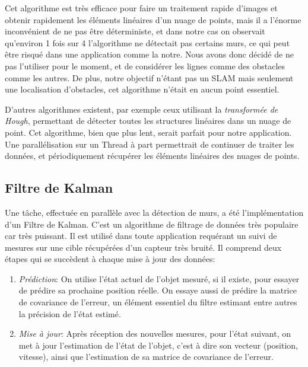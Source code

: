 
Cet algorithme est très efficace pour faire un traitement rapide d'images et obtenir rapidement les éléments linéaires d'un nuage de points, mais il a l'énorme inconvénient de ne pas être déterministe, et dans notre cas on observait qu'environ 1 fois sur 4 l'algorithme ne détectait pas certains murs, ce qui peut être risqué dans une application comme la notre. Nous avons donc décidé de ne pas l'utiliser pour le moment, et de considérer les lignes comme des obstacles comme les autres. De plus, notre objectif n'étant pas un SLAM mais seulement une localisation d'obstacles, cet algorithme n'était en aucun point essentiel.

D'autres algorithmes existent, par exemple ceux utilisant la \textit{transformée de Hough}, permettant de détecter toutes les structures linéaires dans un nuage de point. Cet algorithme, bien que plus lent, serait parfait pour notre application. Une parallélisation sur un Thread à part permettrait de continuer de traiter les données, et périodiquement récupérer les éléments linéaires des nuages de points.


\subsection{Filtre de Kalman}
\tab Une tâche, effectuée en parallèle avec la détection de murs, a été l'implémentation d'un Filtre de Kalman. C'est un algorithme de filtrage de données très populaire car très puissant. Il est utilisé dans toute application requérant un suivi de mesures sur une cible récupérées d'un capteur très bruité.\cite{efk}
Il comprend deux étapes qui se succèdent à chaque mise à jour des données:
\tab \begin{enumerate}
            \item \textit{Prédiction}: On utilise l'état actuel de l'objet mesuré, si il existe, pour essayer de prédire sa prochaine position réelle. On essaye aussi de prédire la matrice de covariance de l'erreur, un élément essentiel du filtre estimant entre autres la précision de l'état estimé.
            \item \textit{Mise à jour}: Après réception des nouvelles mesures, pour l'état suivant, on met à jour l'estimation de l'état de l'objet, c'est à dire son vecteur (position, vitesse), ainsi que l'estimation de sa matrice de covariance de l'erreur.
        \end{enumerate}
        
